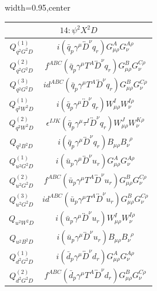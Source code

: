 \begin{table}[H]
\begin{center}
\begin{adjustbox}{width=0.95\textwidth,center}
\small
\begin{minipage}[t]{5.9cm}
\renewcommand{\arraystretch}{1.5}
\begin{tabular}[t]{c|c}
\multicolumn{2}{c}{\boldmath$14:\psi^2X^2D$} \\
\hline
$Q_{q^2G^2D}^{(1)}$  &  $i (\bar q_p \gamma^\mu \overleftrightarrow{D}^\nu q_r) G_{\mu\rho}^A G_{\nu}^{A\rho}$ \\
%
$Q_{q^2G^2D}^{(2)}$  &  $f^{ABC} (\bar q_p \gamma^\mu T^A \overleftrightarrow{D}^\nu q_r) G_{\mu\rho}^B G_{\nu}^{C\rho}$ \\
%
$Q_{q^2G^2D}^{(3)}$  &  $i d^{ABC} (\bar q_p \gamma^\mu T^A \overleftrightarrow{D}^\nu q_r) G_{\mu\rho}^B G_{\nu}^{C\rho}$ \\
%
$Q_{q^2W^2D}^{(1)}$  &  $i (\bar q_p \gamma^\mu \overleftrightarrow{D}^\nu q_r) W_{\mu\rho}^I W_{\nu}^{I\rho}$ \\
%
$Q_{q^2W^2D}^{(2)}$  &  $\epsilon^{IJK} (\bar q_p \gamma^\mu \tau^I \overleftrightarrow{D}^\nu q_r) W_{\mu\rho}^J W_{\nu}^{K\rho}$ \\
%
$Q_{q^2B^2D}$  &  $i (\bar q_p \gamma^\mu \overleftrightarrow{D}^\nu q_r) B_{\mu\rho} B_\nu^{\,\,\,\rho}$  \\
%
$Q_{u^2G^2D}^{(1)}$  &  $i (\bar u_p \gamma^\mu \overleftrightarrow{D}^\nu u_r) G_{\mu\rho}^A G_{\nu}^{A\rho}$ \\
%
$Q_{u^2G^2D}^{(2)}$  &  $f^{ABC} (\bar u_p \gamma^\mu T^A \overleftrightarrow{D}^\nu u_r) G_{\mu\rho}^B G_{\nu}^{C\rho}$ \\
%
$Q_{u^2G^2D}^{(3)}$  &  $i d^{ABC} (\bar u_p \gamma^\mu T^A \overleftrightarrow{D}^\nu u_r) G_{\mu\rho}^B G_{\nu}^{C\rho}$ \\
%
$Q_{u^2W^2D}$  &  $i (\bar u_p \gamma^\mu \overleftrightarrow{D}^\nu u_r) W_{\mu\rho}^I W_{\nu}^{I\rho}$ \\
%
$Q_{u^2B^2D}$  &  $i (\bar u_p \gamma^\mu \overleftrightarrow{D}^\nu u_r) B_{\mu\rho} B_\nu^{\,\,\,\rho}$ \\
%
$Q_{d^2G^2D}^{(1)}$  &  $i (\bar d_p \gamma^\mu \overleftrightarrow{D}^\nu d_r) G_{\mu\rho}^A G_{\nu}^{A\rho}$ \\
%
$Q_{d^2G^2D}^{(2)}$  &  $f^{ABC} (\bar d_p \gamma^\mu T^A \overleftrightarrow{D}^\nu d_r) G_{\mu\rho}^B G_{\nu}^{C\rho}$ \\

\end{tabular}
\end{minipage}
\end{adjustbox}
\end{center}
\end{table}
